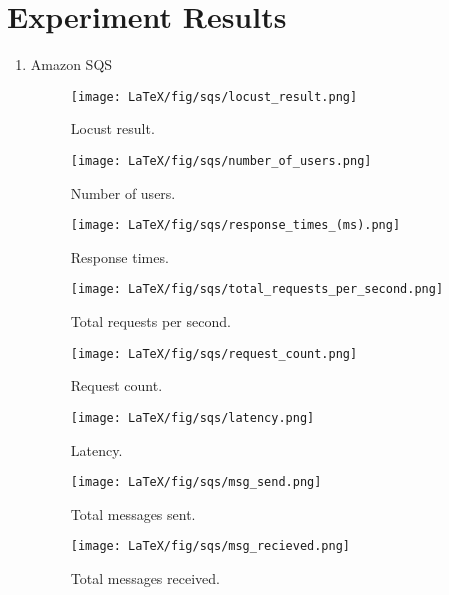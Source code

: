 \documentclass{IEEEtran}
\begin{document}
\section{Experiment Results}\label{sec:results}
\renewcommand{\labelenumi}{\alph{enumi})}
\begin{enumerate}
    \item Amazon SQS
    \begin{figure}[H]
    \texttt{[image: LaTeX/fig/sqs/locust\_result.png]}
    \caption{Locust result.}
    \end{figure}
    \begin{figure}[H]
    \texttt{[image: LaTeX/fig/sqs/number\_of\_users.png]}
    \caption{Number of users.}
    \end{figure}
    \begin{figure}[H]
    \texttt{[image: LaTeX/fig/sqs/response\_times\_(ms).png]}
    \caption{Response times.}
    \end{figure}
    \begin{figure}[H]
    \texttt{[image: LaTeX/fig/sqs/total\_requests\_per\_second.png]}
    \caption{Total requests per second.}
    \end{figure}
    \begin{figure}[H]
    \texttt{[image: LaTeX/fig/sqs/request\_count.png]}
    \caption{Request count.}
    \end{figure}
    \begin{figure}[H]
    \texttt{[image: LaTeX/fig/sqs/latency.png]}
    \caption{Latency.}
    \end{figure}
    \begin{figure}[H]
    \texttt{[image: LaTeX/fig/sqs/msg\_send.png]}
    \caption{Total messages sent.}
    \end{figure}
    \begin{figure}[H]
    \texttt{[image: LaTeX/fig/sqs/msg\_recieved.png]}
    \caption{Total messages received.}
    \end{figure}
    

\end{enumerate}
\end{document}
